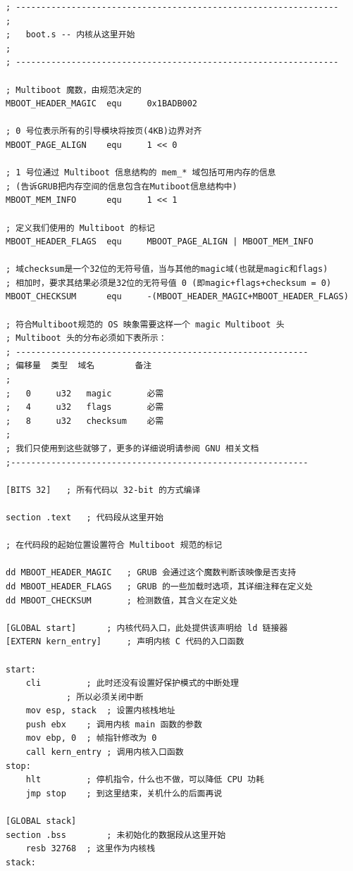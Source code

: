 \begin{lstlisting}[language = {[x86masm]Assembler}, label = boot/boot.s, caption = boot/boot.s]
; ----------------------------------------------------------------
;
; 	boot.s -- 内核从这里开始
;
; ----------------------------------------------------------------

; Multiboot 魔数，由规范决定的
MBOOT_HEADER_MAGIC 	equ 	0x1BADB002

; 0 号位表示所有的引导模块将按页(4KB)边界对齐
MBOOT_PAGE_ALIGN 	equ 	1 << 0

; 1 号位通过 Multiboot 信息结构的 mem_* 域包括可用内存的信息
; (告诉GRUB把内存空间的信息包含在Mutiboot信息结构中)
MBOOT_MEM_INFO 		equ 	1 << 1    

; 定义我们使用的 Multiboot 的标记
MBOOT_HEADER_FLAGS 	equ 	MBOOT_PAGE_ALIGN | MBOOT_MEM_INFO

; 域checksum是一个32位的无符号值，当与其他的magic域(也就是magic和flags)
; 相加时，要求其结果必须是32位的无符号值 0 (即magic+flags+checksum = 0)
MBOOT_CHECKSUM 		equ 	-(MBOOT_HEADER_MAGIC+MBOOT_HEADER_FLAGS)

; 符合Multiboot规范的 OS 映象需要这样一个 magic Multiboot 头
; Multiboot 头的分布必须如下表所示：
; ----------------------------------------------------------
; 偏移量  类型  域名        备注
;
;   0     u32   magic       必需
;   4     u32   flags       必需 
;   8     u32   checksum    必需 
;
; 我们只使用到这些就够了，更多的详细说明请参阅 GNU 相关文档
;-----------------------------------------------------------

[BITS 32]  	; 所有代码以 32-bit 的方式编译

section .text 	; 代码段从这里开始

; 在代码段的起始位置设置符合 Multiboot 规范的标记

dd MBOOT_HEADER_MAGIC 	; GRUB 会通过这个魔数判断该映像是否支持
dd MBOOT_HEADER_FLAGS   ; GRUB 的一些加载时选项，其详细注释在定义处
dd MBOOT_CHECKSUM       ; 检测数值，其含义在定义处

[GLOBAL start] 		; 内核代码入口，此处提供该声明给 ld 链接器
[EXTERN kern_entry] 	; 声明内核 C 代码的入口函数

start:
	cli  		; 此时还没有设置好保护模式的中断处理
			; 所以必须关闭中断
	mov esp, stack  ; 设置内核栈地址
	push ebx 	; 调用内核 main 函数的参数
	mov ebp, 0 	; 帧指针修改为 0
	call kern_entry	; 调用内核入口函数
stop:
	hlt 		; 停机指令，什么也不做，可以降低 CPU 功耗
	jmp stop 	; 到这里结束，关机什么的后面再说
	
[GLOBAL stack]
section .bss 		; 未初始化的数据段从这里开始
	resb 32768 	; 这里作为内核栈
stack:
\end{lstlisting} 

